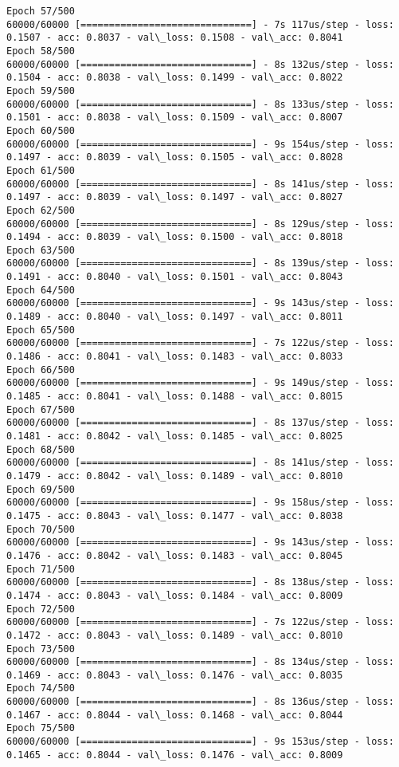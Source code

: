 \documentclass[11pt]{article}
\begin{document}
\begin{Verbatim}[commandchars=\\\{\}]
Epoch 57/500
60000/60000 [==============================] - 7s 117us/step - loss: 0.1507 - acc: 0.8037 - val\_loss: 0.1508 - val\_acc: 0.8041
Epoch 58/500
60000/60000 [==============================] - 8s 132us/step - loss: 0.1504 - acc: 0.8038 - val\_loss: 0.1499 - val\_acc: 0.8022
Epoch 59/500
60000/60000 [==============================] - 8s 133us/step - loss: 0.1501 - acc: 0.8038 - val\_loss: 0.1509 - val\_acc: 0.8007
Epoch 60/500
60000/60000 [==============================] - 9s 154us/step - loss: 0.1497 - acc: 0.8039 - val\_loss: 0.1505 - val\_acc: 0.8028
Epoch 61/500
60000/60000 [==============================] - 8s 141us/step - loss: 0.1497 - acc: 0.8039 - val\_loss: 0.1497 - val\_acc: 0.8027
Epoch 62/500
60000/60000 [==============================] - 8s 129us/step - loss: 0.1494 - acc: 0.8039 - val\_loss: 0.1500 - val\_acc: 0.8018
Epoch 63/500
60000/60000 [==============================] - 8s 139us/step - loss: 0.1491 - acc: 0.8040 - val\_loss: 0.1501 - val\_acc: 0.8043
Epoch 64/500
60000/60000 [==============================] - 9s 143us/step - loss: 0.1489 - acc: 0.8040 - val\_loss: 0.1497 - val\_acc: 0.8011
Epoch 65/500
60000/60000 [==============================] - 7s 122us/step - loss: 0.1486 - acc: 0.8041 - val\_loss: 0.1483 - val\_acc: 0.8033
Epoch 66/500
60000/60000 [==============================] - 9s 149us/step - loss: 0.1485 - acc: 0.8041 - val\_loss: 0.1488 - val\_acc: 0.8015
Epoch 67/500
60000/60000 [==============================] - 8s 137us/step - loss: 0.1481 - acc: 0.8042 - val\_loss: 0.1485 - val\_acc: 0.8025
Epoch 68/500
60000/60000 [==============================] - 8s 141us/step - loss: 0.1479 - acc: 0.8042 - val\_loss: 0.1489 - val\_acc: 0.8010
Epoch 69/500
60000/60000 [==============================] - 9s 158us/step - loss: 0.1475 - acc: 0.8043 - val\_loss: 0.1477 - val\_acc: 0.8038
Epoch 70/500
60000/60000 [==============================] - 9s 143us/step - loss: 0.1476 - acc: 0.8042 - val\_loss: 0.1483 - val\_acc: 0.8045
Epoch 71/500
60000/60000 [==============================] - 8s 138us/step - loss: 0.1474 - acc: 0.8043 - val\_loss: 0.1484 - val\_acc: 0.8009
Epoch 72/500
60000/60000 [==============================] - 7s 122us/step - loss: 0.1472 - acc: 0.8043 - val\_loss: 0.1489 - val\_acc: 0.8010
Epoch 73/500
60000/60000 [==============================] - 8s 134us/step - loss: 0.1469 - acc: 0.8043 - val\_loss: 0.1476 - val\_acc: 0.8035
Epoch 74/500
60000/60000 [==============================] - 8s 136us/step - loss: 0.1467 - acc: 0.8044 - val\_loss: 0.1468 - val\_acc: 0.8044
Epoch 75/500
60000/60000 [==============================] - 9s 153us/step - loss: 0.1465 - acc: 0.8044 - val\_loss: 0.1476 - val\_acc: 0.8009

\end{Verbatim}
\end{document}
